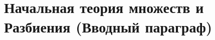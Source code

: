 \chapter[Множества и Разбиения]{Начальная теория множеств и Разбиения (Вводный параграф)}\label{ch:ch-1}




